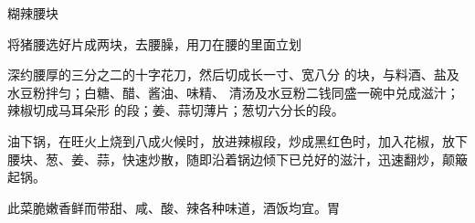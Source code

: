 \begin{recipe}[宫保腰块]{糊辣腰块}

\ingredients


\cooking

\step 将猪腰选好片成两块，去腰臊，用刀在腰的里面立划

深约腰厚的三分之二的十字花刀，然后切成长一寸、宽八分 的块，与料酒、盐及水豆粉拌匀；白糖、醋、酱油、味精、 清汤及水豆粉二钱同盛一碗中兑成滋汁；辣椒切成马耳朵形 的段；姜、蒜切薄片；葱切六分长的段。

\step 油下锅，在旺火上烧到八成火候时，放进辣椒段，炒成黑红色时，加入花椒，放下腰块、葱、姜、蒜，快速炒散，随即沿着锅边倾下已兑好的滋汁，迅速翻炒，颠簸起锅。

\notes

此菜脆嫩香鲜而带甜、咸、酸、辣各种味道，酒饭均宜。胃

\end{recipe}

